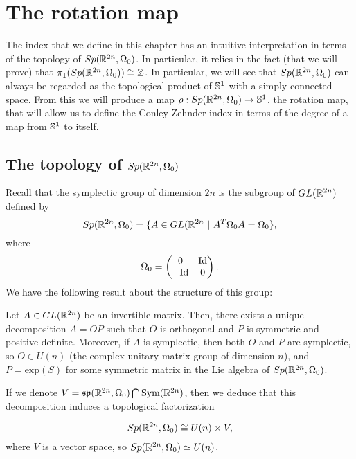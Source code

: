 \section{The rotation map}

The index that we define in this chapter has an intuitive interpretation in terms of the topology of $Sp(\mathbb{R}^{2n},\Omega_0)$. In particular, it relies in the fact (that we will prove) that $\pi_1(Sp(\mathbb{R}^{2n},\Omega_0)) \cong \mathbb{Z}$. In particular, we will see that $Sp(\mathbb{R}^{2n},\Omega_0)$ can always be regarded as the topological product of $\mathbb{S}^1$ with a simply connected space. From this we will produce a map $\rho : Sp(\mathbb{R}^{2n},\Omega_0) \rightarrow \mathbb{S}^1$, the rotation map, that will allow us to define the Conley-Zehnder index in terms of the degree of a map from $\mathbb{S}^1$ to itself.

\subsection{The topology of $Sp(\mathbb{R}^{2n},\Omega_0)$}

Recall that the symplectic group of dimension $2n$ is the subgroup of $GL(\mathbb{R}^{2n})$ defined by
\[Sp(\mathbb{R}^{2n}, \Omega_0) = \{A \in GL(\mathbb{R}^{2n} \ | \ A^T \Omega_0 A = \Omega_0\} ,\]
where
\[\Omega_0 = \begin{pmatrix} 0 & \text{Id} \\ - \text{Id} & 0 \end{pmatrix} .\]
We have the following result about the structure of this group:

\begin{theo} Let $A \in GL(\mathbb{R}^{2n})$ be an invertible matrix. Then, there exists a unique decomposition $A = OP$ such that $O$ is orthogonal and $P$ is symmetric and positive definite. Moreover, if $A$ is symplectic, then both $O$ and $P$ are symplectic, so $O \in U(n)$ (the complex unitary matrix group of dimension $n$), and $P = \text{exp}(S)$ for some symmetric matrix in the Lie algebra of $Sp(\mathbb{R}^{2n},\Omega_0)$.

If we denote $V = \mathfrak{sp}(\mathbb{R}^{2n},\Omega_0) \bigcap \text{Sym}(\mathbb{R}^{2n})$, then we deduce that this decomposition induces a topological factorization

\[Sp(\mathbb{R}^{2n}, \Omega_0) \cong U(n) \times V ,\]
where $V$ is a vector space, so $Sp(\mathbb{R}^{2n},\Omega_0) \simeq U(n)$.
\end{theo}

